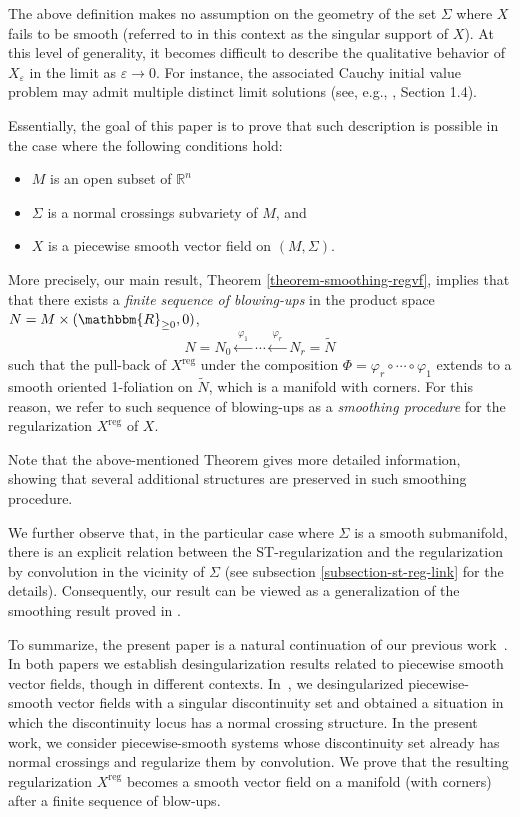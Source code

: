 \documentclass[11pt,psamsfonts]{article}
\theoremstyle{definition}
\theoremstyle{remark}
\newcommand{\cR}{\ensuremath{\mathbbm{R}}}
\newcommand{\eps}{\varepsilon }
\newcommand{\reg}{\mathrm{reg}}
\begin{document}
The above definition makes no assumption on the geometry of the set $\Sigma$ where $X$ fails to be smooth (referred to in this context as the singular support of $X$). At this level of generality, it becomes difficult to describe the qualitative behavior of $X_\eps$ in the limit as $\eps \to 0$. For instance, the associated Cauchy initial value problem may admit multiple distinct limit solutions (see, e.g., \cite{HormanderNHDE}, Section 1.4).

Essentially, the goal of this paper is to prove that such description is possible in the case where the following conditions hold:
\begin{itemize}
\item $M$ is an open subset of $\mathbb{R}^n$
\item $\Sigma$ is a normal crossings subvariety of $M$, and
\item $X$ is a piecewise smooth vector field on $(M,\Sigma)$.
\end{itemize}
More precisely, our main result, Theorem \ref{theorem-smoothing-regvf}, implies that that there exists a {\em finite sequence of blowing-ups} in the product space $N = M\times (\cR_{\ge 0},0)$,
\[
N = N_0
\xleftarrow{\;\varphi_1\;}
\cdots
\xleftarrow{\;\varphi_r\;}
N_r = \widetilde{N}
\]
such that the pull-back of $X^\reg$ under the composition $\Phi = \varphi_r\circ\cdots\circ \varphi_1$ extends to a smooth oriented 1-foliation on $\widetilde{N}$, which is a manifold with corners. For this reason, we refer to such sequence of blowing-ups as a {\em smoothing procedure} for the regularization $X^\reg$ of $X$. 

Note that the above-mentioned Theorem gives more detailed information, showing that several additional structures are preserved in such smoothing procedure.

We further observe that, in the particular case where $\Sigma$ is a smooth submanifold, there is an explicit relation between the ST-regularization and the regularization by convolution in the vicinity of $\Sigma$ (see subsection \ref{subsection-st-reg-link} for the details). Consequently, our result can be viewed as a generalization of the smoothing result proved in \cite{PS}. 

To summarize, the present paper is a natural continuation of our previous work~\cite{PS}. 
In both papers we establish desingularization results related to piecewise smooth vector fields, though in different contexts. 
In~\cite{PS}, we desingularized piecewise-smooth vector fields with a singular 
discontinuity set and obtained a situation in which the discontinuity locus has a 
normal crossing structure. In the present work, we consider piecewise-smooth systems 
whose discontinuity set already has normal crossings and regularize them by convolution. 
We prove that the resulting regularization \( X^\reg \) becomes a smooth vector 
field on a manifold (with corners) after a finite sequence of blow-ups.
\end{document}
